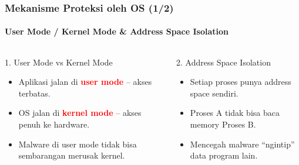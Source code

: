 \documentclass[t,aspectratio=169,xcolor=dvipsnames]{beamer}
\newcommand{\tem}[1]{\textbf{\textcolor{red}{#1}}}
\begin{document}
\begin{frame}[shrink=5]
    \frametitle{Mekanisme Proteksi oleh OS (1/2)}
    \framesubtitle{User Mode / Kernel Mode \& Address Space Isolation}

    \begin{columns}[T]
        \begin{block}{1. User Mode vs Kernel Mode}
            \small
            \begin{itemize}
                \item Aplikasi jalan di \tem{user mode} -- akses terbatas.
                \item OS jalan di \tem{kernel mode} -- akses penuh ke hardware.
                \item Malware di user mode tidak bisa sembarangan merusak kernel.
            \end{itemize}
        \end{block}

        \begin{block}{2. Address Space Isolation}
            \small
            \begin{itemize}
                \item Setiap proses punya address space sendiri.
                \item Proses A tidak bisa baca memory Proses B.
                \item Mencegah malware ``ngintip'' data program lain.
            \end{itemize}
        \end{block}
    \end{columns}
\end{frame}
\end{document}
